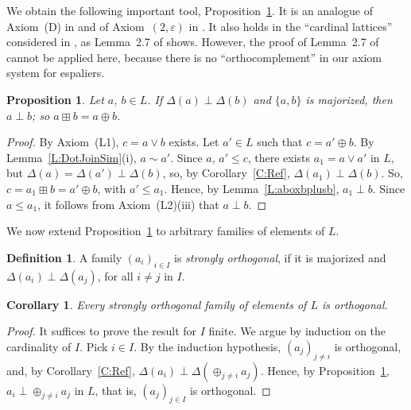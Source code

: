\documentclass[psamsfonts,reqno]{memo-l}
\theoremstyle{plain}
\newtheorem{proposition}[lemma]{Proposition}
\newtheorem{corollary}[lemma]{Corollary}
\theoremstyle{definition}
\newtheorem{definition}[lemma]{Definition}
\theoremstyle{remark}
\numberwithin{equation}{section}
\newcommand{\eps}{\varepsilon}
\newcommand{\DD}{\Delta}
\newcommand{\set}[1]{\{#1\}}
\newcommand{\famm}[2]{(#1)_{#2}}
\begin{document}
We obtain the following important tool, Proposition~\ref{P:aboxplusb}. It is
an analogue of Axiom~(D) in \cite{Loom55} and of
Axiom~$(2,\eps)$ in
\cite{SMae55}. It also holds in the ``cardinal lattices''
 considered in
\cite{Fill65}, as Lemma~2.7 of \cite{Fill65} shows. However, the proof of
Lemma~2.7 of \cite{Fill65} cannot be applied here, because there is no
``orthocomplement'' in our axiom system for espaliers.

\begin{proposition}\label{P:aboxplusb}
Let $a$, $b\in L$. If $\DD(a)\perp\DD(b)$ and $\set{a,b}$ is majorized, then
$a\perp b$; so $a\boxplus b=a\oplus b$.
\end{proposition}

\begin{proof}
By Axiom~(L1), $c=a\vee b$ exists.
Let $a'\in L$ such that $c=a'\oplus b$. By Lemma~\ref{L:DotJoinSim}(i),
$a\sim a'$. Since $a$, $a'\leq c$, there exists $a_1=a\vee a'$ in $L$, but
$\DD(a)=\DD(a')\perp\DD(b)$, so, by Corollary~\ref{C:Ref},
$\DD(a_1)\perp\DD(b)$. So, $c=a_1\boxplus b=a'\oplus b$, with $a'\leq a_1$.
Hence, by Lemma~\ref{L:aboxbplusb}, $a_1\perp b$. Since $a\leq a_1$, it
follows from Axiom~(L2)(iii) that $a\perp b$.
\end{proof}

We now extend Proposition~\ref{P:aboxplusb} to arbitrary families of
elements of $L$.

\begin{definition}\label{D:StrongOrth}
A family $\famm{a_i}{i\in I}$ is \emph{strongly orthogonal},
 if
it is majorized and $\DD(a_i)\perp\DD(a_j)$, for all $i\neq j$ in $I$.
\end{definition}

\begin{corollary}\label{C:aiStrOrth}
Every strongly orthogonal family of elements of $L$ is orthogonal.
\end{corollary}

\begin{proof}
It suffices to prove the result for $I$ finite. We argue by induction on
the cardinality of $I$. Pick $i\in I$. By the induction hypothesis,
$\famm{a_j}{j\neq i}$ is orthogonal, and, by Corollary~\ref{C:Ref},
$\DD(a_i)\perp\DD(\oplus_{j\neq i}a_j)$. Hence, by
Proposition~\ref{P:aboxplusb}, $a_i\perp\oplus_{j\neq i}a_j$ in $L$, that is,
$\famm{a_j}{j\in I}$ is orthogonal.
\end{proof}
\end{document}
